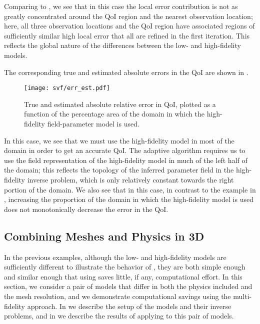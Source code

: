 %
Comparing to , we see that in this case the local error contribution is not as greatly concentrated around the QoI region and the nearest observation location; here, all three observation locations and the QoI region have associated regions of sufficiently similar high local error that all are refined in the first iteration. This reflects the global nature of the differences between the low- and high-fidelity models. 

The corresponding true and estimated absolute errors in the QoI are shown in .
%
\begin{figure}[htbp]
\centering
\texttt{[image: svf/err\_est.pdf]}
\caption{True and estimated absolute relative error in QoI, plotted as a function of the percentage area of the domain in which the high-fidelity field-parameter model is used.}
\label{fig:svfErr}
\end{figure}
%
In this case, we see that we must use the high-fidelity model in most of the domain in order to get an accurate QoI. The adaptive algorithm requires us to use the field representation of the high-fidelity model in much of the left half of the domain; this reflects the topology of the inferred parameter field in the high-fidelity inverse problem, which is only relatively constant towards the right portion of the domain. We also see that in this case, in contrast to the example in , increasing the proportion of the domain in which the high-fidelity model is used does not monotonically decrease the error in the QoI.

\subsection{Combining Meshes and Physics in 3D} \label{sec:diffvcdr3D}

In the previous examples, although the low- and high-fidelity models are sufficiently different to illustrate the behavior of , they are both simple enough and similar enough that using  saves little, if any, computational effort. In this section, we consider a pair of models that differ in both the physics included and the mesh resolution, and we demonstrate computational savings using the multi-fidelity approach. In  we describe the setup of the models and their inverse problems, and in  we describe the results of applying  to this pair of models.

